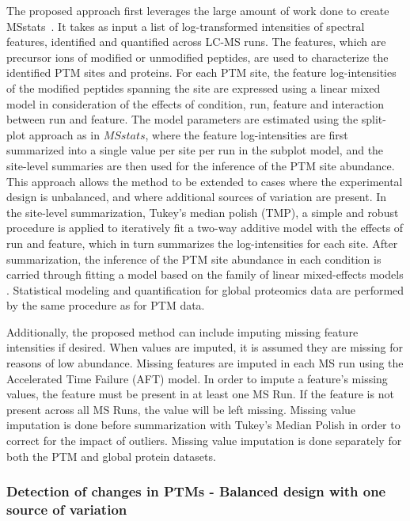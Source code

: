 \documentclass[mcp]{article}
\numberwithin{table}{section}
\begin{document}
The proposed approach first leverages the large amount of work done to create MSstats~\cite{Choi:2014}. It takes as input a list of log-transformed intensities of spectral features, identified and quantified across LC-MS runs. The features, which are precursor ions of modified or unmodified peptides, are used to characterize the identified PTM sites and proteins. For each PTM site, the feature log-intensities of the modified peptides spanning the site are expressed using a linear mixed model in consideration of the effects of condition, run, feature and interaction between run and feature. The model parameters are estimated using the split-plot approach as in $MSstats$, where the feature log-intensities are first summarized into a single value per site per run in the subplot model, and the site-level summaries are then used for the inference of the PTM site abundance\cite{Choi:2014}. This approach allows the method to be extended to cases where the experimental design is unbalanced, and where additional sources of variation are present. In the site-level summarization, Tukey's median polish (TMP), a simple and robust procedure is applied to iteratively fit a two-way additive model with the effects of run and feature, which in turn summarizes the log-intensities for each site\cite{Tukey:1977}. After summarization, the inference of the PTM site abundance in each condition is carried through fitting a model based on the family of linear mixed-effects models\cite{Bolker2009} \cite{Faraway:2006}. Statistical modeling and quantification for global proteomics data are performed by the same procedure as for PTM data.

Additionally, the proposed method can include imputing missing feature intensities if desired. When values are imputed, it is assumed they are missing for reasons of low abundance. Missing features are imputed in each MS run using the Accelerated Time Failure (AFT) model\cite{Tukey:1977}. In order to impute a feature's missing values, the feature must be present in at least one MS Run. If the feature is not present across all MS Runs, the value will be left missing. Missing value imputation is done before summarization with Tukey's Median Polish in order to correct for the impact of outliers. Missing value imputation is done separately for both the PTM and global protein datasets.

\subsubsection*{Detection of changes in PTMs - Balanced design with one source of variation}
\label{sec:adjustment_summary}
\end{document}
